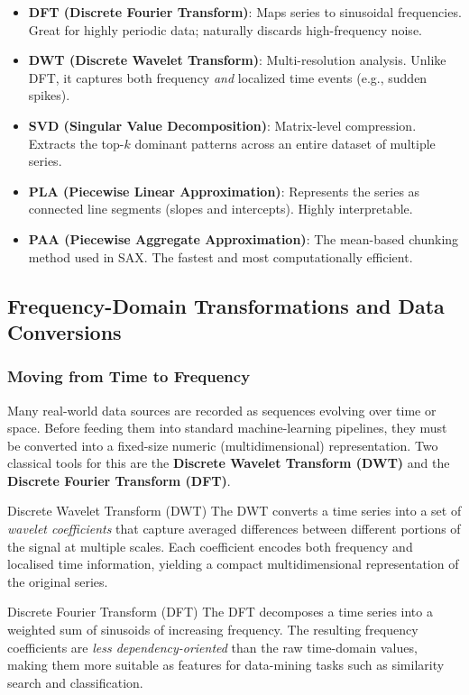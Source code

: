 \documentclass[11pt]{article}
\theoremstyle{smallexample}
\begin{document}
\begin{itemize}
    \item \textbf{DFT (Discrete Fourier Transform)}: Maps series to sinusoidal frequencies. Great for highly periodic data; naturally discards high-frequency noise.
    \item \textbf{DWT (Discrete Wavelet Transform)}: Multi-resolution analysis. Unlike DFT, it captures both frequency \textit{and} localized time events (e.g., sudden spikes).
    \item \textbf{SVD (Singular Value Decomposition)}: Matrix-level compression. Extracts the top-$k$ dominant patterns across an entire dataset of multiple series.
    \item \textbf{PLA (Piecewise Linear Approximation)}: Represents the series as connected line segments (slopes and intercepts). Highly interpretable.
    \item \textbf{PAA (Piecewise Aggregate Approximation)}: The mean-based chunking method used in SAX. The fastest and most computationally efficient.
\end{itemize}

\subsection{Frequency-Domain Transformations and Data Conversions}

\subsubsection{Moving from Time to Frequency}


Many real-world data sources are recorded as sequences evolving over time or
space. Before feeding them into standard machine-learning pipelines, they must
be converted into a fixed-size numeric (multidimensional) representation. Two
classical tools for this are the \textbf{Discrete Wavelet Transform (DWT)} and
the \textbf{Discrete Fourier Transform (DFT)}.

\begin{defbox}{Discrete Wavelet Transform (DWT)}
  The DWT converts a time series into a set of \emph{wavelet coefficients} that
  capture averaged differences between different portions of the signal at
  multiple scales. Each coefficient encodes both frequency and localised time
  information, yielding a compact multidimensional representation of the
  original series.
\end{defbox}

\begin{defbox}{Discrete Fourier Transform (DFT)}
  The DFT decomposes a time series into a weighted sum of sinusoids of
  increasing frequency. The resulting frequency coefficients are
  \emph{less dependency-oriented} than the raw time-domain values, making them
  more suitable as features for data-mining tasks such as similarity search and
  classification.
\end{defbox}
\end{document}
